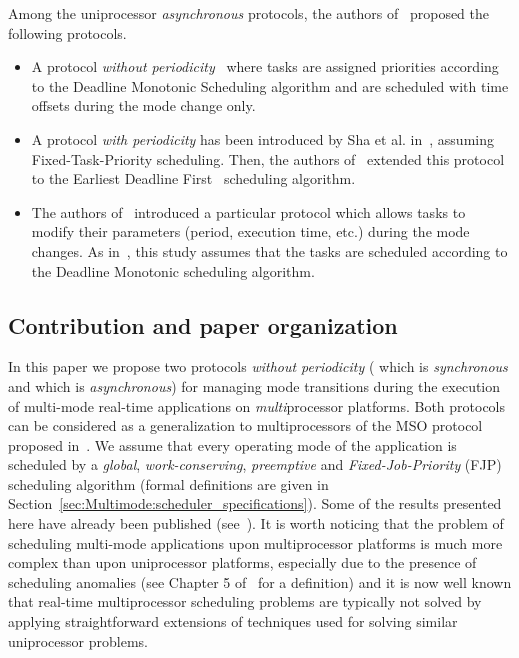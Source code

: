 \documentclass{article}
\newtheorem{validity test}{Validity Test}
\begin{document}
\noindent Among the uniprocessor \emph{asynchronous} protocols, the authors of~\cite{Tindell:92,Pedro:99,Andersson:08} proposed the following protocols.
\begin{itemize}
\renewcommand{\labelitemi}{}
\item A protocol \emph{without periodicity}~\cite{Pedro:99} where tasks are assigned priorities according to the Deadline Monotonic Scheduling algorithm and are scheduled with time offsets during the mode change only. 

\item A protocol \emph{with periodicity} has been introduced by Sha et al. in~\cite{Sha:88}, assuming Fixed-Task-Priority scheduling. Then, the authors of~\cite{Andersson:08} extended this protocol to the Earliest Deadline First~\cite{Liu:73} scheduling algorithm.

\item The authors of~\cite{Tindell:92} introduced a particular protocol which allows tasks to modify their parameters (period, execution time, etc.) during the mode changes.  As in~\cite{Pedro:99}, this study assumes that the tasks are scheduled according to the Deadline Monotonic scheduling algorithm.
\end{itemize}

\subsection{Contribution and paper organization}

In this paper we propose two protocols \emph{without periodicity} ( which is \emph{synchronous} and  which is \emph{asynchronous}) for managing mode transitions during the execution of multi-mode real-time applications on \emph{multi}processor platforms. Both protocols can be considered as a generalization to multiprocessors of the MSO protocol proposed in~\cite{JoAlfons:04}. We assume that every operating mode of the application is scheduled by a \emph{global}, \emph{work-conserving}, \emph{preemptive} and \emph{Fixed-Job-Priority} (FJP) scheduling algorithm (formal definitions are given in Section~\ref{sec:Multimode:scheduler_specifications}). Some of the results presented here have already been published (see~\cite{MeumeuNelisGoossens:10, NelisAnderssonGoossens:09, NelisGoossensAndersson:09, NelisGoossens:08}). It is worth noticing that the problem of scheduling multi-mode applications upon multiprocessor platforms is much more complex than upon uniprocessor platforms, especially due to the presence of scheduling anomalies (see Chapter 5 of~\cite{Andersson:03} for a definition) and it is now well known that real-time multiprocessor scheduling problems are typically not solved by applying straightforward extensions of techniques used for solving similar uniprocessor problems. 
\end{document}
